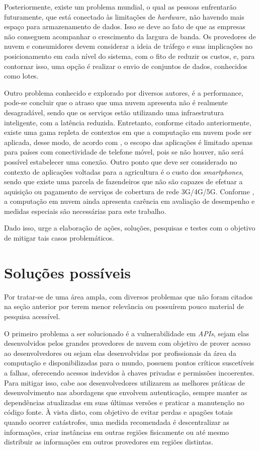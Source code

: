 \documentclass[12pt]{article}
\begin{document}
Posteriormente, existe um problema mundial, o qual as pessoas enfrentarão futuramente, que está conectado às limitações de \emph{hardware}, não havendo mais espaço para armazenamento de dados. Isso se deve ao fato de que as empresas não conseguem acompanhar o crescimento da largura de banda. Os provedores de nuvem e consumidores devem considerar a ideia de tráfego e suas implicações no posicionamento em cada nível do sistema, com o fito de reduzir os custos, e, para contornar isso, uma opção é realizar o envio de conjuntos de dados, conhecidos como lotes.

Outro problema conhecido e explorado por diversos autores, é a performance, pode-se concluir que o atraso que uma nuvem apresenta não é realmente desagradável, sendo que os serviços estão utilizando uma infraestrutura inteligente, com a latência reduzida. Entretanto, conforme citado anteriormente, existe uma gama repleta de contextos em que a computação em nuvem pode ser aplicada, desse modo, de acordo com \cite{prasad}, o escopo das aplicações é limitado apenas para países com conectividade de telefone móvel, pois se não houver, não será possível estabelecer uma conexão. Outro ponto que deve ser considerado no contexto de aplicações voltadas para a agricultura é o custo dos \emph{smartphones}, sendo que existe uma parcela de fazendeiros que não são capazes de efetuar a aquisição ou pagamento de serviços de cobertura de rede 3G/4G/5G. Conforme \cite{reza}, a computação em nuvem ainda apresenta carência em avaliação de desempenho e medidas especiais são necessárias para este trabalho.

Dado isso, urge a elaboração de ações, soluções, pesquisas e testes com o objetivo de mitigar tais casos problemáticos.

\section{Soluções possíveis}
Por tratar-se de uma área ampla, com diversos problemas que não foram citados na seção anterior por terem menor relevância ou possuírem pouco material de pesquisa acessível.

O primeiro problema a ser solucionado é a vulnerabilidade em \emph{APIs}, sejam elas desenvolvidos pelos grandes provedores de nuvem com objetivo de prover acesso ao desenvolvedores ou sejam elas desenvolvidas por profissionais da área da computação e disponibilizadas para o mundo, possuem pontos críticos suscetíveis a falhas, oferecendo acessos indevidos à chaves privadas e permissões incoerentes. Para mitigar isso, cabe aos desenvolvedores utilizarem as melhores práticas de desenvolvimento nas abordagens que envolvem autenticação, sempre manter as dependências atualizadas em suas últimas versões e praticar a manutenção no código fonte. À vista disto, com objetivo de evitar perdas e apagões totais quando ocorrer catástrofes, uma medida recomendada é descentralizar as informações, criar instâncias em outras regiões fisicamente ou até mesmo distribuir as informações em outros provedores em regiões distintas.
\end{document}
